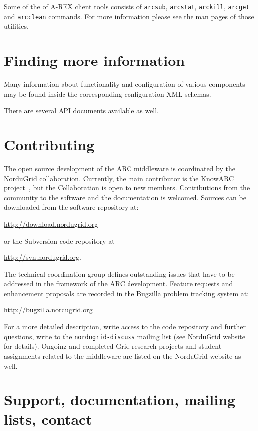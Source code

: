 \documentclass{article}                            %
\begin{document}
Some of the of A-REX client tools consists of \texttt{arcsub}, \texttt{arcstat},
\texttt{arckill}, \texttt{arcget} and \texttt{arcclean} commands. For more
information please see the man pages of those utilities.

\section{Finding more information}
\label{sec:more-info}

Many information about functionality and configuration of various components
may be found inside the corresponding configuration XML schemas.

There are several API documents available as well.

\section{Contributing}
\label{sec:contributing}

The open source development of the ARC middleware is coordinated by the
NorduGrid collaboration. Currently, the main contributor is the KnowARC
project~\cite{knowarc}, but the Collaboration is open to new members.
Contributions from the community to the software and the documentation is
welcomed. Sources can be downloaded from the software repository at:

\url{http://download.nordugrid.org}

or the Subversion code repository at

\url{http://svn.nordugrid.org}.

The technical coordination group defines outstanding issues that have
to be addressed in the framework of the ARC development. Feature
requests and enhancement proposals are recorded in the Bugzilla problem
tracking system at:

 \url{http://bugzilla.nordugrid.org}

For a more detailed description, write access to the code repository and
further questions, write to the \texttt{nordugrid-discuss} mailing list (see
NorduGrid website~\cite{nordugrid} for details). Ongoing and completed Grid
research projects and student assignments related to the middleware are listed
on the NorduGrid website as well.


\section{Support, documentation, mailing lists, contact}
\label{sec:support}
\end{document}
